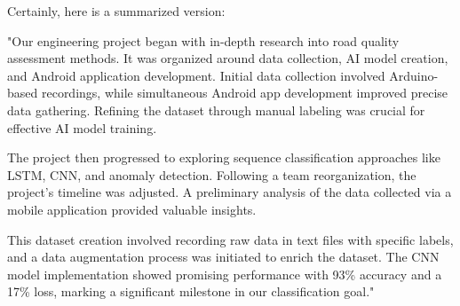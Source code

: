 Certainly, here is a summarized version:

"Our engineering project began with in-depth research into road quality assessment methods. It was organized around data collection, AI model creation, and Android application development. Initial data collection involved Arduino-based recordings, while simultaneous Android app development improved precise data gathering. Refining the dataset through manual labeling was crucial for effective AI model training.

The project then progressed to exploring sequence classification approaches like LSTM, CNN, and anomaly detection. Following a team reorganization, the project's timeline was adjusted. A preliminary analysis of the data collected via a mobile application provided valuable insights.

This dataset creation involved recording raw data in text files with specific labels, and a data augmentation process was initiated to enrich the dataset. The CNN model implementation showed promising performance with 93\% accuracy and a 17\% loss, marking a significant milestone in our classification goal."